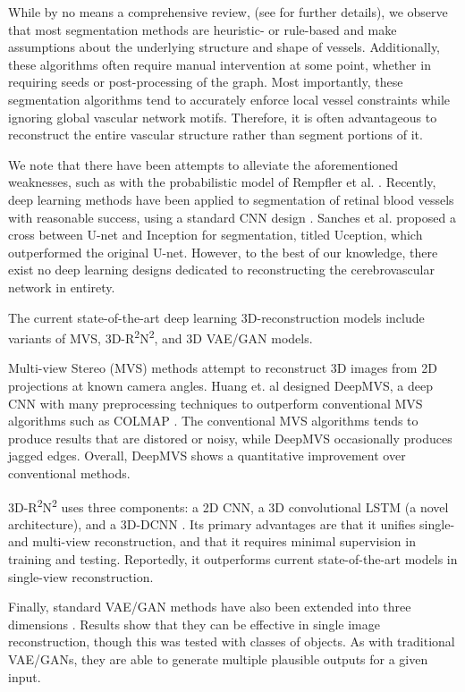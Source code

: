 \documentclass[letterpaper, 10 pt, journal]{ieeeconf}
\begin{document}
While by no means a comprehensive review, (see \cite{segmentation_all} for further details), we observe that most segmentation methods are heuristic- or rule-based and make assumptions about the underlying structure and shape of vessels.
Additionally, these algorithms often require manual intervention at some point, whether in requiring seeds or post-processing of the graph.
Most importantly, these segmentation algorithms tend to accurately enforce local vessel constraints while ignoring global vascular network motifs.
Therefore, it is often advantageous to reconstruct the entire vascular structure rather than segment portions of it.

We note that there have been attempts to alleviate the aforementioned weaknesses, such as with the probabilistic model of Rempfler et al. \cite{reconstruction_probability}.
Recently, deep learning methods have been applied to segmentation of retinal blood vessels with reasonable success, using a standard CNN design \cite{segmentation_retinal}.
Sanches et al. \cite{segmentation_dl} proposed a cross between U-net and Inception for segmentation, titled Uception, which outperformed the original U-net.
However, to the best of our knowledge, there exist no deep learning designs dedicated to reconstructing the cerebrovascular network in entirety.

The current state-of-the-art deep learning 3D-reconstruction models include variants of MVS, 3D-R\textsuperscript{2}N\textsuperscript{2}, and 3D VAE/GAN models.

Multi-view Stereo (MVS) methods attempt to reconstruct 3D images from 2D projections at known camera angles.
Huang et. al designed DeepMVS, a deep CNN with many preprocessing techniques to outperform conventional MVS algorithms such as COLMAP \cite{deepmvs}.
The conventional MVS algorithms tends to produce results that are distored or noisy, while DeepMVS occasionally produces jagged edges.
Overall, DeepMVS shows a quantitative improvement over conventional methods.

3D-R\textsuperscript{2}N\textsuperscript{2} uses three components: a 2D CNN, a 3D convolutional LSTM (a novel architecture), and a 3D-DCNN \cite{3d-r2n2}.
Its primary advantages are that it unifies single- and multi-view reconstruction, and that it requires minimal supervision in training and testing.
Reportedly, it outperforms current state-of-the-art models in single-view reconstruction.

Finally, standard VAE/GAN methods have also been extended into three dimensions \cite{3dvaegan}.
Results show that they can be effective in single image reconstruction, though this was tested with classes of objects.
As with traditional VAE/GANs, they are able to generate multiple plausible outputs for a given input.
\end{document}
